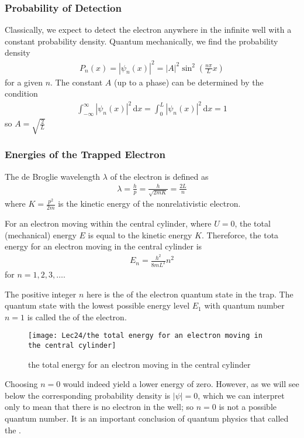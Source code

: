 \subsubsection{Probability of Detection}
Classically, we expect to detect the electron anywhere in the infinite well with a constant probability density. Quantum mechanically, we find the probability density 
\begin{align*}
    P_n(x)=|\psi_n(x)|^2=|A|^2\sin^2\left(\frac{n\pi}{L}x\right)
\end{align*}
for a given $n$. The constant $A$ (up to a phase) can be determined by the  condition
\begin{align*}
    \int_{-\infty}^{\infty}|\psi_n(x)|^2\,\mathrm{d}x=\int_0^L|\psi_n(x)|^2\,\mathrm{d}x=1
\end{align*}
so $A=\sqrt{\frac{2}{L}}$

\subsubsection{Energies of the Trapped Electron}
The de Broglie wavelength $\lambda$ of the electron is defined as 
\begin{align*}
    \lambda=\frac{h}{p}=\frac{h}{\sqrt{2mK}}=\frac{2L}{n}
\end{align*}
where $K=\frac{p^2}{2m}$ is the kinetic energy of the nonrelativistic electron. 

For an electron moving within the central cylinder, where $U=0$, the total (mechanical) energy $E$ is equal to the kinetic energy $K$. Thereforce, the tota energy for an electron moving in the central cylinder is 
\begin{align*}
    E_n=\frac{h^2}{8mL^2}n^2
\end{align*}
for $n=1,2,3,\dots$. 

The positive integer $n$ here is the  of the electron quantum state in the trap. The quantum state with the lowest possible energy level $E_1$ with quantum number $n=1$ is called the  of the electron. 

\begin{figure}[H]
    \centering
    \texttt{[image: Lec24/the total energy for an electron moving in the central cylinder]}
    \caption{the total energy for an electron moving in the central cylinder}
\end{figure}

 Choosing $n=0$ would indeed yield a lower energy of zero. However, as we will see below the corresponding probability density is $|\psi|=0$, which we can interpret only to mean that there is no electron in the well; so $n=0$ is not a possible quantum number. It is an important conclusion of quantum physics that  called the . 

